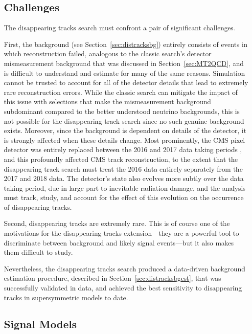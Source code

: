   \subsection{Challenges} \label{sec:distrackschallenges}

  The disappearing tracks search must confront a pair of significant challenges.

  First, the background (see Section~\ref{sec:distracksbg}) entirely consists of events in which reconstruction failed, analogous to the classic search's detector mismeasurement background that was discussed in Section~\ref{sec:MT2QCD}, and is difficult to understand and estimate for many of the same reasons.
  Simulation cannot be trusted to account for all of the detector details that lead to extremely rare reconstruction errors.
  While the classic search can mitigate the impact of this issue with selections that make the mismeasurement background subdominant compared to the better understood neutrino backgrounds, this is not possible for the disappearing track search since no such genuine background exists.
  Moreover, since the background is dependent on details of the detector, it is strongly affected when these details change.
  Most prominently, the CMS pixel detector was entirely replaced between the 2016 and 2017 data taking periods \cite{phase1}, and this profoundly affected CMS track reconstruction, to the extent that the disappearing track search must treat the 2016 data entirely separately from the 2017 and 2018 data.
  The detector's state also evolves more subtly over the data taking period, due in large part to inevitable radiation damage, and the analysis must track, study, and account for the effect of this evolution on the occurrence of disappearing tracks.
  
  Second, disappearing tracks are extremely rare.
  This is of course one of the motivations for the disappearing tracks extension---they are a powerful tool to discriminate between background and likely signal events---but it also makes them difficult to study.
  
  Nevertheless, the disappearing tracks search produced a data-driven background estimation procedure, described in Section~\ref{sec:distracksbgest}, that was successfully validated in data, and achieved the best sensitivity to disappearing tracks in supersymmetric models to date.
  
  \subsection{Signal Models} \label{sec:distrackssig}


